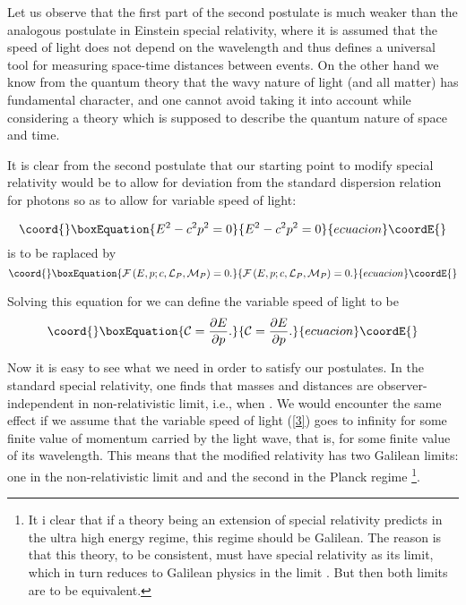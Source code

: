 \documentclass [11pt] {article}
\begin{document}
Let us observe that the first part of the second postulate is much
weaker than the analogous postulate in Einstein special
relativity, where it is assumed that the speed of light does not
depend on the wavelength and thus defines a universal tool for
measuring space-time distances between events. On the other hand
we know from the quantum theory that the wavy nature of light (and
all matter) has fundamental character, and one cannot avoid taking
it into account while considering a theory which is supposed to
describe the quantum nature of space and time.
\newline





It is clear from the second postulate that our starting point to
modify special relativity would be to allow for deviation from the
standard dispersion relation for photons so as to allow for
variable speed of light:

\begin{equation}\coord{}\boxEquation{\label{1}
 E^2 - c^2 p^2 = 0
}{E^2 - c^2 p^2 = 0
}{ecuacion}\coordE{}\end{equation}
is to be raplaced by
\begin{equation}\coord{}\boxEquation{\label{2}
  {\cal F}\left(E, p; c, {\cal L}_P, {\cal M}_P\right) =0.
}{{\cal F}\left(E, p; c, {\cal L}_P, {\cal M}_P\right) =0.
}{ecuacion}\coordE{}\end{equation}

Solving this equation for \coordHE{} we can define the variable speed of light \coordHE{}
to be
\begin{equation}\coord{}\boxEquation{\label{3}
{\cal C} = \frac{\partial E}{\partial p}.
}{{\cal C} = \frac{\partial E}{\partial p}.
}{ecuacion}\coordE{}\end{equation}

Now it is easy to see what we need in order to satisfy our postulates. In 
the standard special relativity, one finds that masses and distances are 
observer-independent in non-relativistic limit, i.e., when \coordHE{}. We would encounter the same effect if we assume that the 
variable speed of light (\ref{3}) goes to infinity for some finite value of 
momentum carried by the light wave, that is, for some finite value of its 
wavelength. This means that the modified relativity has two Galilean 
limits: one in the non-relativistic limit \coordHE{} and \coordHE{} and the second in the Planck regime \coordHE{}\footnote{It i clear that if a theory being an extension of special 
relativity predicts \coordHE{} in the ultra high energy 
regime, this regime should be Galilean. The reason is that this theory, to 
be consistent, must have special relativity as its limit, which in turn 
reduces to Galilean physics in the limit \coordHE{}. But then both limits 
are to be equivalent.}. 
\end{document}
